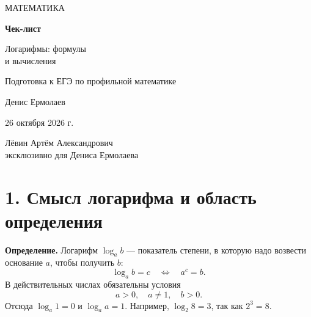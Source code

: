 \documentclass[a4paper,11pt]{article}
\begin{document}
\thispagestyle{empty}
\begin{center}
\vspace*{25mm}
{\large\color{darkaccent}\MakeUppercase{Математика}}\par
\vspace{19mm}
{\Huge\bfseries Чек-лист}\par
\vspace{14mm}
{\LARGE\color{accent} Логарифмы: формулы\\[2mm] и вычисления}\par
\vspace{19mm}
{\large Подготовка к ЕГЭ по профильной математике}\par
\vfill
{\Large Денис Ермолаев}\par
\vspace{11mm}
{\large 26 октября 2026 г.}\par
\vspace{13mm}
{\normalsize Лёвин Артём Александрович}\\[2mm]
{\normalsize эксклюзивно для Дениса Ермолаева}\par
\vspace{23mm}
\end{center}
\clearpage

\section*{1. Смысл логарифма и область определения}
\textbf{Определение.} Логарифм \(\log_a b\) --- показатель степени, в которую надо возвести основание \(a\), чтобы получить \(b\):
\[
\boxed{\log_a b=c\quad\Longleftrightarrow\quad a^c=b.}
\]
В действительных числах обязательны условия
\[
\boxed{a>0,\quad a\ne1,\quad b>0.}
\]
Отсюда \(\log_a1=0\) и \(\log_a a=1\). Например, \(\log_2 8=3\), так как \(2^3=8\).
\end{document}
